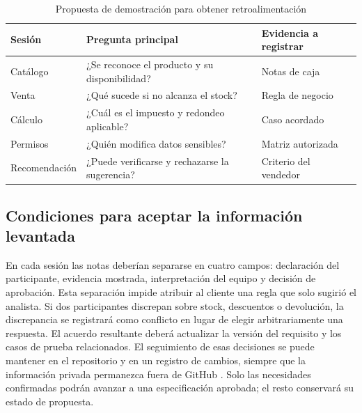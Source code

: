 \begin{table}[!ht]
\centering\scriptsize
\caption{Propuesta de demostración para obtener retroalimentación}
\label{tab:sesionesPropuestas}
\begin{tabularx}{\columnwidth}{@{}P{1.15cm}Y P{1.05cm}@{}}
\toprule Sesión & Pregunta principal & Evidencia a registrar\\\midrule
Catálogo & ¿Se reconoce el producto y su disponibilidad? & Notas de caja\\
Venta & ¿Qué sucede si no alcanza el stock? & Regla de negocio\\
Cálculo & ¿Cuál es el impuesto y redondeo aplicable? & Caso acordado\\
Permisos & ¿Quién modifica datos sensibles? & Matriz autorizada\\
Recomendación & ¿Puede verificarse y rechazarse la sugerencia? & Criterio del vendedor\\
\bottomrule
\end{tabularx}
\end{table}

\subsection{Condiciones para aceptar la información levantada}
En cada sesión las notas deberían separarse en cuatro campos: declaración del participante, evidencia mostrada, interpretación del equipo y decisión de aprobación. Esta separación impide atribuir al cliente una regla que solo sugirió el analista. Si dos participantes discrepan sobre stock, descuentos o devolución, la discrepancia se registrará como conflicto en lugar de elegir arbitrariamente una respuesta. El acuerdo resultante deberá actualizar la versión del requisito y los casos de prueba relacionados. El seguimiento de esas decisiones se puede mantener en el repositorio y en un registro de cambios, siempre que la información privada permanezca fuera de GitHub \cite{pohl2025,swebok2024}. Solo las necesidades confirmadas podrán avanzar a una especificación aprobada; el resto conservará su estado de propuesta.

